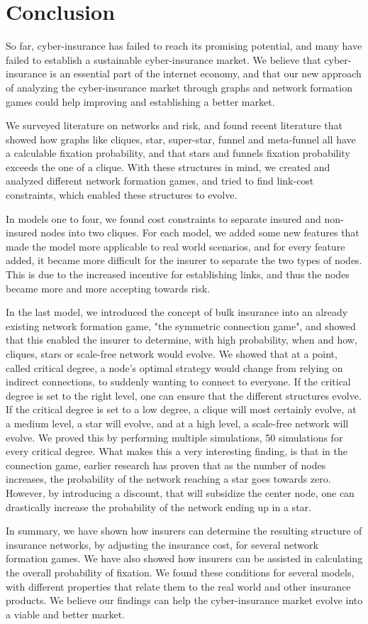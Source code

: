 \section{Conclusion}

So far, cyber-insurance has failed to reach its promising potential, and many have failed to establish a sustainable cyber-insurance market. We believe that cyber-insurance is an essential part of the internet economy, and that our new approach of analyzing the cyber-insurance market through graphs and network formation games could help improving and establishing a better market.  

We surveyed literature on networks and risk, and found recent literature that showed how graphs like cliques, star, super-star, funnel and meta-funnel all have a calculable fixation probability, and that stars and funnels fixation probability exceeds the one of a clique. 
With these structures in mind, we created and analyzed different network formation games, and tried to find link-cost constraints, which enabled these structures to evolve.

In models one to four, we found cost constraints to separate insured and non-insured nodes into two cliques. 
For each model, we added some new features that made the model more applicable to real world scenarios, and for every feature added, it became more difficult for the insurer to separate the two types of nodes. This is due to the increased incentive for establishing links, and thus the nodes became more and more accepting towards risk. 


In the last model, we introduced the concept of bulk insurance into an already existing network formation game, "the symmetric connection game", and showed that this enabled the insurer to determine, with high probability, when and how, cliques, stars or scale-free network would evolve. We showed that at a point, called critical degree, a node's optimal strategy would change from relying on indirect connections, to suddenly wanting to connect to everyone. If the critical degree is set to the right level, one can ensure that the different structures evolve. If the critical degree is set to a low degree, a clique will most certainly evolve, at a medium level, a star will evolve, and at a high level, a scale-free network will evolve. We proved this by performing multiple simulations, 50 simulations for every critical degree.  
What makes this a very interesting finding, is that in the connection game, earlier research has proven that as the number of nodes increases, the probability of the network reaching a star goes towards zero. However, by introducing a discount, that will subsidize the center node, one can drastically increase the probability of the network ending up in a star.

In summary, we have shown how insurers can determine the resulting structure of insurance networks, by adjusting the insurance cost, for several network formation games. We have also showed how insurers can be assisted in calculating the overall probability of fixation.
We found these conditions for several models, with different properties that relate them to the real world and other insurance products. We believe our findings can help the cyber-insurance market evolve into a viable and better market.